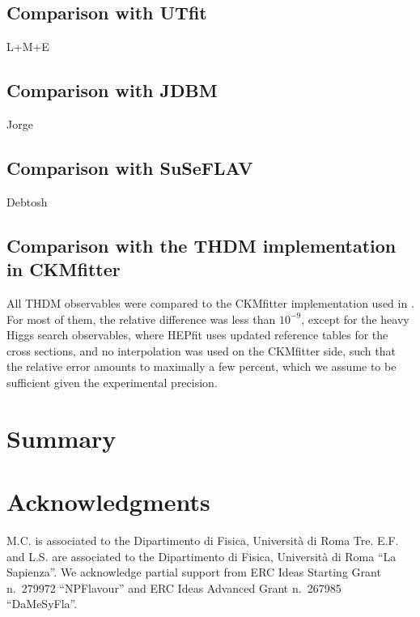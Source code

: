 \documentclass[preprint,3p,12pt]{elsarticle}
\begin{document}
{{}%

\subsection{Comparison with UTfit}
\label{sec:UTfit}

L+M+E

\subsection{Comparison with JDBM}
\label{sec:JDBM}

Jorge

\subsection{Comparison with SuSeFLAV}
\label{sec:Debtosh}

Debtosh

\subsection{Comparison with the THDM implementation in CKMfitter}
\label{sec:CKMfitter}

All THDM observables were compared to the CKMfitter implementation used in \cite{Eberhardt:2013uba,Eberhardt:2013wia,Baglio:2014nea,Chowdhury:2015yja}. For most of them, the relative difference was less than $10^{-9}$, except for the heavy Higgs search observables, where HEPfit uses updated reference tables for the cross sections, and no interpolation was used on the CKMfitter side, such that the relative error amounts to maximally a few percent, which we assume to be sufficient given the experimental precision.


\section{Summary}



\section*{Acknowledgments}
M.C. is associated to the Dipartimento di Fisica, Universit\`a di Roma
Tre. E.F. and L.S. are associated to the Dipartimento di Fisica,
Universit\`a di Roma ``La Sapienza''. We acknowledge partial support
from ERC Ideas Starting Grant n.~279972 ``NPFlavour'' and ERC Ideas
Advanced Grant n.~267985 ``DaMeSyFla''.




}
\end{document}
